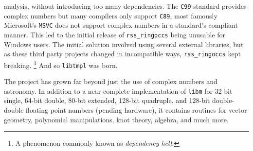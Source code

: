 \documentclass{article}
\theoremstyle{plain}
\begin{document}
        analysis, without introducing too many dependencies.
        The \texttt{C99} standard provides complex numbers but many compilers
        only support \texttt{C89}, most famously Microsoft's \texttt{MSVC} does
        not support complex numbers in a standard's compliant manner. This led
        to the initial release of \texttt{rss\_ringoccs} being unusable for
        Windows users. The initial solution involved using several external
        libraries, but as these third party projects changed in incompatible
        ways, \texttt{rss\_ringoccs} kept breaking.%
        \footnote{%
            A phenomenon commonly known as \textit{dependency hell}.
        }
        And so \texttt{libtmpl} was born.
        \par\hfill\par
        The project has grown far beyond just the use of complex numbers and
        astronomy. In addition to a near-complete implementation of
        \texttt{libm} for 32-bit single, 64-bit double, 80-bit extended,
        128-bit quadruple, and 128-bit double-double floating point numbers
        (pending hardware), it contains routines for vector geometry,
        polynomial manipulations, knot theory, algebra, and much more.
    \newpage
    
    
\end{document}
